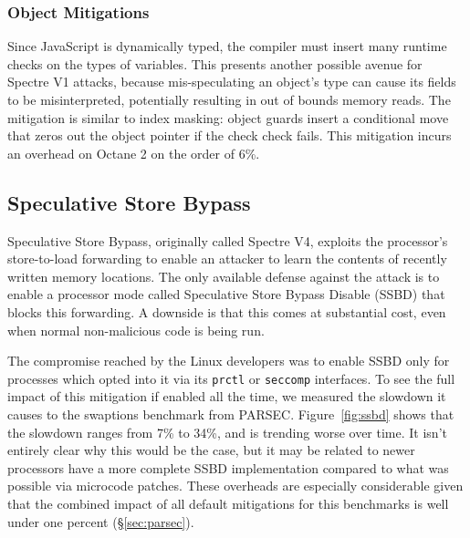 \subsubsection{Object Mitigations}

Since JavaScript is dynamically typed, the compiler must insert many runtime checks on the types of variables.
This presents another possible avenue for Spectre V1 attacks, because mis-speculating an object's type can cause its fields to be misinterpreted, potentially resulting in out of bounds memory reads.
The mitigation is similar to index masking: object guards insert a conditional move that zeros out the object pointer if the check check fails.
This mitigation incurs an overhead on Octane 2 on the order of 6\%.

\subsection{Speculative Store Bypass}
\label{sec:ssb}

Speculative Store Bypass, originally called Spectre V4, exploits the processor's store-to-load forwarding to enable an attacker to learn the contents of recently written memory locations.
The only available defense against the attack is to enable a processor mode called Speculative Store Bypass Disable (SSBD) that blocks this forwarding.
A downside is that this comes at substantial cost, even when normal non-malicious code is being run.

The compromise reached by the Linux developers was to enable SSBD only for processes which opted into it via its \texttt{prctl} or \texttt{seccomp} interfaces.
To see the full impact of this mitigation if enabled all the time, we measured the slowdown it causes to the swaptions benchmark from PARSEC.
Figure~\ref{fig:ssbd} shows that the slowdown ranges from 7\% to 34\%,
and is trending worse over time.
It isn't entirely clear why this would be the case, but it may be related to newer processors have a more complete SSBD implementation compared to what was possible via microcode patches.
These overheads are especially considerable given that the combined
impact of all default mitigations for this benchmarks is well under one percent (\S\ref{sec:parsec}).

